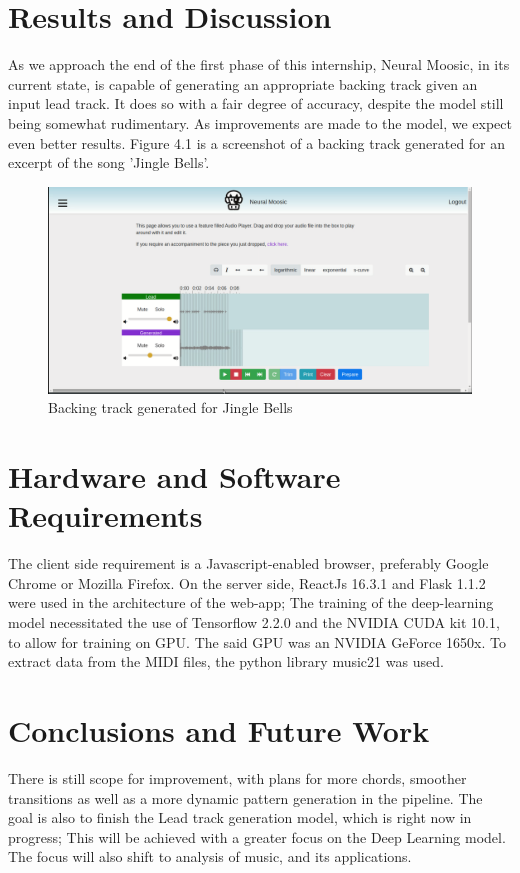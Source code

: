 \documentclass[12pt]{report}
\begin{document}
\chapter{Results and Discussion}
As we approach the end of the first phase of this internship, Neural Moosic, in its current state, is capable of generating an appropriate backing track given an input lead track. It does so with a fair degree of accuracy, despite the model still being somewhat rudimentary. As improvements are made to the model, we expect even better results. Figure 4.1 is a screenshot of a backing track generated for an excerpt of the song 'Jingle Bells'.
\begin{figure}[ht]
  \includegraphics[width =\columnwidth]{sc.png}
  \caption{Backing track generated for Jingle Bells}
  \label{working demo}
\end{figure}

\chapter{Hardware and Software Requirements}
The client side requirement is a Javascript-enabled browser, preferably Google Chrome or Mozilla Firefox. 
On the server side, ReactJs 16.3.1 and Flask 1.1.2 were used in the architecture of the web-app; The training of the deep-learning model necessitated the use of Tensorflow 2.2.0 and the NVIDIA CUDA kit 10.1, to allow for training on GPU. The said GPU was an NVIDIA GeForce 1650x. To extract data from the MIDI files, the python library music21 was used.

\chapter{Conclusions and Future Work}
There is still scope for improvement, with plans for more chords, smoother transitions as well as a more dynamic pattern generation in the pipeline. The goal is also to finish the Lead track generation model, which is right now in progress; This will be achieved with a greater focus on the Deep Learning model. The focus will also shift to analysis of music, and its applications.
\end{document}
